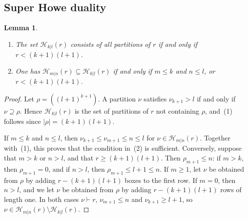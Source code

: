 \documentclass[11pt,a4paper]{amsart}
\newtheorem{lemma}[theorem]{Lemma}
\theoremstyle{definition}
\theoremstyle{remark}
\numberwithin{equation}{section}
\begin{document}
\subsection{Super Howe duality}
\label{sec:howe-theorem}

\begin{lemma}\label{lem:hook-inclusion}
\begin{enumerate}
\item The set $\mathcal H_{k|l}(r)$ consists of all partitions of $r$ if
and only if $r<(k+1)(l+1)$.
\item One has $\mathcal H_{m|n}(r)\subseteq\mathcal H_{k|l}(r)$ if and only
if $m\leq k$ and $n\leq l$, or $r<(k+1)(l+1)$.
\end{enumerate}
\end{lemma}
\begin{proof}
Let $\rho=((l+1)^{k+1})$. A partition $\nu$ satisfies $\nu_{k+1}>l$ if and
only if $\nu\supseteq\rho$. Hence $\mathcal H_{k|l}(r)$ is the set of
partitions of $r$ not containing $\rho$, and~(1) follows since
$|\rho|=(k+1)(l+1)$.

If $m\leq k$ and $n\leq l$, then $\nu_{k+1}\leq\nu_{m+1}\leq n\leq l$ for
$\nu\in\mathcal H_{m|n}(r)$. Together with~(1), this proves that the
condition in~(2) is sufficient. Conversely, suppose that $m>k$ or $n>l$,
and that $r\geq(k+1)(l+1)$. Then $\rho_{m+1}\leq n$: if $m>k$, then
$\rho_{m+1}=0$, and if $n>l$, then $\rho_{m+1}\leq l+1\leq n$. If
$m\geq1$, let $\nu$ be obtained from $\rho$ by adding
$r-(k+1)(l+1)$ boxes to the first row. If $m=0$, then $n>l$, and we let
$\nu$ be obtained from $\rho$ by adding $r-(k+1)(l+1)$ rows of length one.
In both cases $\nu\vdash r$, $\nu_{m+1}\leq n$ and $\nu_{k+1}\geq l+1$, so
$\nu\in\mathcal H_{m|n}(r)\setminus\mathcal H_{k|l}(r)$.
\end{proof}
\end{document}
